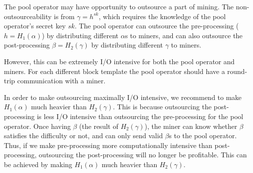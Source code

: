 The pool operator may have opportunity to outsource a part of mining.
The non-outsourceability is from $\gamma = h^{sk}$, which requires the knowledge of the pool operator's secret key $sk$.
The pool operator can outsource the pre-processing ($h = H_1(\alpha)$) by distributing different $\alpha$s to miners, and can also outsource the post-processing $\beta = H_2(\gamma)$ by distributing different $\gamma$ to miners.

However, this can be extremely I/O intensive for both the pool operator and miners.
For each different block template the pool operator should have a round-trip communication with a miner.

In order to make outsourcing maximally I/O intensive, we recommend to make $H_1(\alpha)$ much heavier than $H_2(\gamma)$. 
This is because outsourcing the post-processing is less I/O intensive than outsourcing the pre-processing for the pool operator.
Once having $\beta$ (the result of $H_2(\gamma)$), the miner can know whether $\beta$ satisfies the difficulty or not, and can only send valid $\beta$s to the pool operator.
Thus, if we make pre-processing more computationally intensive than post-processing, outsourcing the post-processing will no longer be profitable.
This can be achieved by making $H_1(\alpha)$ much heavier than $H_2(\gamma)$.



